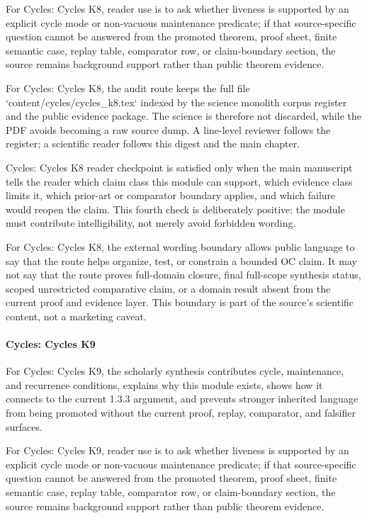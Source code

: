 For Cycles: Cycles K8, reader use is to ask whether liveness is supported by an explicit cycle mode or non-vacuous maintenance predicate; if that source-specific question cannot be answered from the promoted theorem, proof sheet, finite semantic case, replay table, comparator row, or claim-boundary section, the source remains background support rather than public theorem evidence.


For Cycles: Cycles K8, the audit route keeps the full file `content/cycles/cycles\_k8.tex` indexed by the science monolith corpus register and the public evidence package. The science is therefore not discarded, while the PDF avoids becoming a raw source dump. A line-level reviewer follows the register; a scientific reader follows this digest and the main chapter.


Cycles: Cycles K8 reader checkpoint is satisfied only when the main manuscript tells the reader which claim class this module can support, which evidence class limits it, which prior-art or comparator boundary applies, and which failure would reopen the claim. This fourth check is deliberately positive: the module must contribute intelligibility, not merely avoid forbidden wording.


For Cycles: Cycles K8, the external wording boundary allows public language to say that the route helps organize, test, or constrain a bounded OC claim. It may not say that the route proves full-domain closure, final full-scope synthesis status, scoped unrestricted comparative claim, or a domain result absent from the current proof and evidence layer. This boundary is part of the source's scientific content, not a marketing caveat.


\paragraph{Cycles: Cycles K9}

For Cycles: Cycles K9, the scholarly synthesis contributes cycle, maintenance, and recurrence conditions, explains why this module exists, shows how it connects to the current 1.3.3 argument, and prevents stronger inherited language from being promoted without the current proof, replay, comparator, and falsifier surfaces.


For Cycles: Cycles K9, reader use is to ask whether liveness is supported by an explicit cycle mode or non-vacuous maintenance predicate; if that source-specific question cannot be answered from the promoted theorem, proof sheet, finite semantic case, replay table, comparator row, or claim-boundary section, the source remains background support rather than public theorem evidence.


